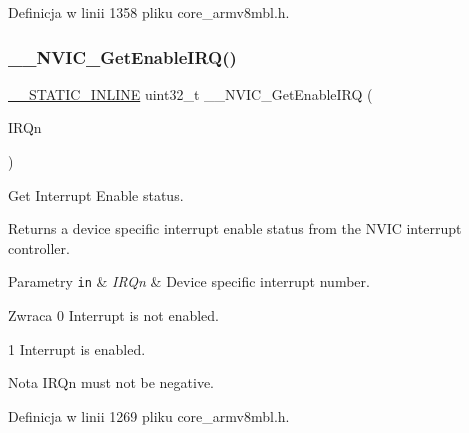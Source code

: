 Definicja w linii 1358 pliku core\+\_\+armv8mbl.\+h.

\mbox{\label{group___c_m_s_i_s___core___n_v_i_c_functions_gaaeb5e7cc0eaad4e2817272e7bf742083}} 
\subsubsection{\texorpdfstring{\+\_\+\+\_\+\+N\+V\+I\+C\+\_\+\+Get\+Enable\+I\+R\+Q()}{\_\_NVIC\_GetEnableIRQ()}}
{\footnotesize\ttfamily \hyperlink{cmsis__iccarm_8h_aba87361bfad2ae52cfe2f40c1a1dbf9c}{\+\_\+\+\_\+\+S\+T\+A\+T\+I\+C\+\_\+\+I\+N\+L\+I\+NE} uint32\+\_\+t \+\_\+\+\_\+\+N\+V\+I\+C\+\_\+\+Get\+Enable\+I\+RQ (\begin{DoxyParamCaption}\item[{\hyperlink{group___peripheral__interrupt__number__definition_ga7e1129cd8a196f4284d41db3e82ad5c8}{I\+R\+Qn\+\_\+\+Type}}]{I\+R\+Qn }\end{DoxyParamCaption})}



Get Interrupt Enable status. 

Returns a device specific interrupt enable status from the N\+V\+IC interrupt controller. 
\begin{DoxyParams}[1]{Parametry}
\mbox{\tt in}  & {\em I\+R\+Qn} & Device specific interrupt number. \\
\hline
\end{DoxyParams}
\begin{DoxyReturn}{Zwraca}
0 Interrupt is not enabled. 

1 Interrupt is enabled. 
\end{DoxyReturn}
\begin{DoxyNote}{Nota}
I\+R\+Qn must not be negative. 
\end{DoxyNote}


Definicja w linii 1269 pliku core\+\_\+armv8mbl.\+h.

\mbox{\label{group___c_m_s_i_s___core___n_v_i_c_functions_ga5a92ca5fa801ad7adb92be7257ab9694}} 
